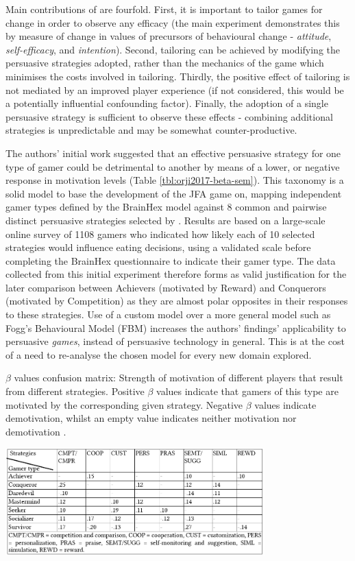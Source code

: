 \documentclass[11pt]{article}
\begin{document}
Main contributions of \citet{orji2017} are fourfold. First, it is important to tailor games for change in order to observe any efficacy (the main experiment demonstrates this by measure of change in values of precursors of behavioural change - \textit{attitude}, \textit{self-efficacy}, and \textit{intention}). Second, tailoring can be achieved by modifying the persuasive strategies adopted, rather than the mechanics of the game which minimises the costs involved in tailoring. Thirdly, the positive effect of tailoring is not mediated by an improved player experience (if not considered, this would be a potentially influential confounding factor). Finally, the adoption of a single persuasive strategy is sufficient to observe these effects - combining additional strategies is unpredictable and may be somewhat counter-productive.

The authors' initial work suggested that an effective persuasive strategy for one type of gamer could be detrimental to another by means of a lower, or negative response in motivation levels \citep{orji2013a} (Table \ref{tbl:orji2017-beta-sem}). This taxonomy is a solid model to base the development of the JFA game on, mapping independent gamer types defined by the BrainHex model \citep{nacke2014} against 8 common and pairwise distinct persuasive strategies selected by \citet{gerling2014}. Results are based on a large-scale online survey of 1108 gamers who indicated how likely each of 10 selected strategies would influence eating decisions, using a validated scale \citep{drozd2012} before completing the BrainHex questionnaire to indicate their gamer type. The data collected from this initial experiment therefore forms as valid justification for the later comparison between Achievers (motivated by Reward) and Conquerors (motivated by Competition) as they are almost polar opposites in their responses to these strategies. Use of a custom model over a more general model such as Fogg's Behavioural Model (FBM) \citep{fogg2009} increases the authors' findings' applicability to persuasive \textit{games}, instead of persuasive technology in general. This is at the cost of a need to re-analyse the chosen model for every new domain explored.

\begin{table}[H]
\centering
\caption{$\beta$ values confusion matrix: Strength of motivation of different players that result from different strategies. Positive $\beta$ values indicate that gamers of this type are motivated by the corresponding given strategy. Negative $\beta$ values indicate demotivation, whilst an empty value indicates neither motivation nor demotivation \protect\citep{orji2013a}.
}\label{tbl:orji2017-beta-sem}
\includegraphics[width=0.75\textwidth]{img/orji2017-beta-sem.png} 
\end{table}
\end{document}
